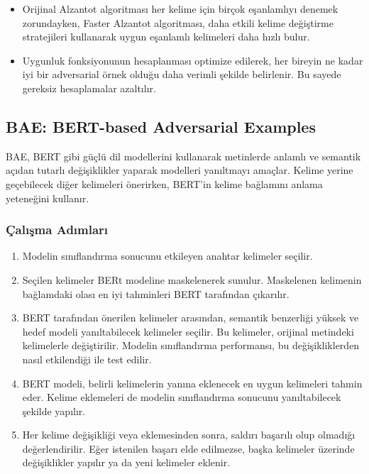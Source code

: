 \begin{itemize}
    \item Orijinal Alzantot algoritması her kelime için birçok eşanlamlıyı denemek zorundayken, Faster Alzantot algoritması, daha etkili kelime değiştirme stratejileri kullanarak uygun eşanlamlı kelimeleri daha hızlı bulur.
    \item Uygunluk fonksiyonunun hesaplanması optimize edilerek, her bireyin ne kadar iyi bir adversarial örnek olduğu daha verimli şekilde belirlenir. Bu sayede gereksiz hesaplamalar azaltılır.
\end{itemize}

\newpage

\subsection{BAE: BERT-based Adversarial Examples}

BAE, BERT gibi güçlü dil modellerini kullanarak metinlerde anlamlı ve semantik açıdan tutarlı değişiklikler yaparak modelleri yanıltmayı amaçlar. Kelime yerine geçebilecek diğer kelimeleri önerirken, BERT'in kelime bağlamını anlama yeteneğini kullanır. 

\subsubsection{Çalışma Adımları}

\begin{enumerate}
    \item Modelin sınıflandırma sonucunu etkileyen anahtar kelimeler seçilir.
    \item Seçilen kelimeler BERt modeline maskelenerek sunulur. Maskelenen kelimenin bağlamdaki olası en iyi tahminleri BERT tarafından çıkarılır.
    \item BERT tarafından önerilen kelimeler arasından, semantik benzerliği yüksek ve hedef modeli yanıltabilecek kelimeler seçilir. Bu kelimeler, orijinal metindeki kelimelerle değiştirilir. Modelin sınıflandırma performansı, bu değişikliklerden nasıl etkilendiği ile test edilir.
    \item BERT modeli, belirli kelimelerin yanına eklenecek en uygun kelimeleri tahmin eder. Kelime eklemeleri de modelin sınıflandırma sonucunu yanıltabilecek şekilde yapılır.
    \item Her kelime değişikliği veya eklemesinden sonra, saldırı başarılı olup olmadığı değerlendirilir. Eğer istenilen başarı elde edilmezse, başka kelimeler üzerinde değişiklikler yapılır ya da yeni kelimeler eklenir.
\end{enumerate}

